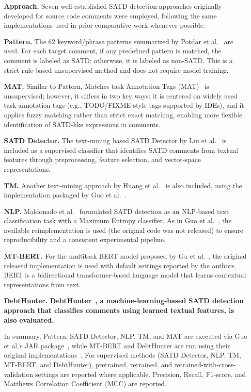 \textbf{Approach.} Seven well-established SATD detection approaches originally developed for source code comments were employed, following the same implementations used in prior comparative work whenever possible.

\textbf{Pattern.} The 62 keyword/phrase patterns summarized by Potdar et al.~\cite{potdar_exploratory_2014} are used. For each target comment, if any predefined pattern is matched, the comment is labeled as SATD; otherwise, it is labeled as non-SATD. This is a strict rule-based unsupervised method and does not require model training.

\textbf{MAT.} Similar to Pattern, Matches task Annotation Tags (MAT)~\cite{guo_how_2021} is unsupervised; however, it differs in two key ways: it is centered on widely used task-annotation tags (e.g., TODO/FIXME-style tags supported by IDEs), and it applies fuzzy matching rather than strict exact matching, enabling more flexible identification of SATD-like expressions in comments.

\textbf{SATD Detector.} The text-mining based SATD Detector by Liu et al.~\cite{liu_satd_2018} is included as a supervised classifier that identifies SATD comments from textual features through preprocessing, feature selection, and vector-space representations.

\textbf{TM.} Another text-mining approach by Huang et al.~\cite{huang_identifying_2018} is also included, using the implementation packaged by Guo et al.~\cite{guo_how_2021}.

\textbf{NLP.} Maldonado et al.~\cite{maldonado_using_2017} formulated SATD detection as an NLP-based text classification task with a Maximum Entropy classifier. As in Guo et al.~\cite{guo_how_2021}, the available reimplementation is used (the original code was not released) to ensure reproducibility and a consistent experimental pipeline.

\textbf{MT-BERT.} For the multitask BERT model proposed by Gu et al.~\cite{gu_self-admitted_2024}, the original released implementation is used with default settings reported by the authors. BERT is a bidirectional transformer-based language model that learns contextual representations from text.

\textbf{DebtHunter. DebtHunter~\cite{sala_debthunter_2021}, a machine-learning-based SATD detection approach that classifies comments using learned textual features, is also evaluated.}

In summary, Pattern, SATD Detector, NLP, TM, and MAT are executed via Guo et al.'s JAR package~\cite{guo_how_2021}, while MT-BERT and DebtHunter are run using their original implementations~\cite{gu_self-admitted_2024,sala_debthunter_2021}. For supervised methods (SATD Detector, NLP, TM, MT-BERT, and DebtHunter), pretrained, retrained, and retrained-with-cross-validation settings are reported where applicable. Precision, Recall, F1-score, and Matthews Correlation Coefficient (MCC) are reported.


